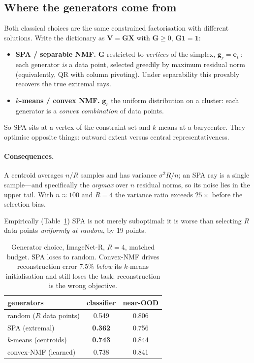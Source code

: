 \documentclass[10pt,twocolumn]{article}
\newcommand{\bV}{\mathbf{V}}
\newcommand{\bX}{\mathbf{X}}
\begin{document}
\subsection{Where the generators come from}
Both classical choices are the same constrained factorisation with different
solutions. Write the dictionary as $\bV = \mathbf{G}\bX$ with
$\mathbf{G}\ge 0$, $\mathbf{G}\mathbf{1}=\mathbf{1}$:
\begin{itemize}\itemsep2pt
\item \textbf{SPA / separable NMF.} $\mathbf{G}$ restricted to \emph{vertices} of
the simplex, $\mathbf{g}_r = \mathbf{e}_{i_r}$: each generator \emph{is} a data
point, selected greedily by maximum residual norm (equivalently, QR with column
pivoting). Under separability this provably recovers the true extremal rays.
\item \textbf{$k$-means / convex NMF.} $\mathbf{g}_r$ the uniform distribution on
a cluster: each generator is a \emph{convex combination} of data points.
\end{itemize}
So SPA sits at a vertex of the constraint set and $k$-means at a barycentre. They
optimise opposite things: outward extent versus central representativeness.

\paragraph{Consequences.} A centroid averages $n/R$ samples and has variance
$\sigma^2R/n$; an SPA ray is a single sample---and specifically the
\emph{argmax} over $n$ residual norms, so its noise lies in the upper tail. With
$n{\approx}100$ and $R{=}4$ the variance ratio exceeds $25\times$ before the
selection bias.

Empirically (Table~\ref{tab:gens}) SPA is not merely suboptimal: it is worse than
selecting $R$ data points \emph{uniformly at random}, by 19 points.

\begin{table}[t]\centering\small
\begin{tabular}{lcc}
\toprule
generators & classifier & near-OOD \\
\midrule
random ($R$ data points) & 0.549 & 0.806 \\
SPA (extremal)           & \textbf{0.362} & 0.756 \\
$k$-means (centroids)    & \textbf{0.743} & 0.844 \\
convex-NMF (learned)     & 0.738 & 0.841 \\
\bottomrule
\end{tabular}
\caption{Generator choice, ImageNet-R, $R{=}4$, matched budget. SPA loses to
random. Convex-NMF drives reconstruction error 7.5\% \emph{below} its $k$-means
initialisation and still loses the task: reconstruction is the wrong objective.}
\label{tab:gens}
\end{table}
\end{document}
